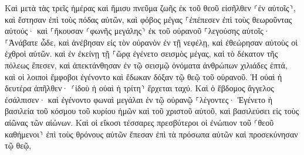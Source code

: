 \documentclass{openreader}
\begin{document}
Καὶ μετὰ τὰς τρεῖς ἡμέρας καὶ ἥμισυ πνεῦμα ζωῆς ἐκ τοῦ θεοῦ εἰσῆλθεν ⸂ἐν αὐτοῖς⸃, καὶ ἔστησαν ἐπὶ τοὺς πόδας αὐτῶν, καὶ φόβος μέγας ⸀ἐπέπεσεν ἐπὶ τοὺς θεωροῦντας αὐτούς· 
καὶ ⸀ἤκουσαν ⸂φωνῆς μεγάλης⸃ ἐκ τοῦ οὐρανοῦ ⸀λεγούσης αὐτοῖς· ⸀Ἀνάβατε ὧδε, καὶ ἀνέβησαν εἰς τὸν οὐρανὸν ἐν τῇ νεφέλῃ, καὶ ἐθεώρησαν αὐτοὺς οἱ ἐχθροὶ αὐτῶν. 
καὶ ἐν ἐκείνῃ τῇ ⸀ὥρᾳ ἐγένετο σεισμὸς μέγας, καὶ τὸ δέκατον τῆς πόλεως ἔπεσεν, καὶ ἀπεκτάνθησαν ἐν τῷ σεισμῷ ὀνόματα ἀνθρώπων χιλιάδες ἑπτά, καὶ οἱ λοιποὶ ἔμφοβοι ἐγένοντο καὶ ἔδωκαν δόξαν τῷ θεῷ τοῦ οὐρανοῦ. 
Ἡ οὐαὶ ἡ δευτέρα ἀπῆλθεν· ⸂ἰδοὺ ἡ οὐαὶ ἡ τρίτη⸃ ἔρχεται ταχύ. 
Καὶ ὁ ἕβδομος ἄγγελος ἐσάλπισεν· καὶ ἐγένοντο φωναὶ μεγάλαι ἐν τῷ οὐρανῷ ⸀λέγοντες· Ἐγένετο ἡ βασιλεία τοῦ κόσμου τοῦ κυρίου ἡμῶν καὶ τοῦ χριστοῦ αὐτοῦ, καὶ βασιλεύσει εἰς τοὺς αἰῶνας τῶν αἰώνων. 
Καὶ οἱ εἴκοσι τέσσαρες πρεσβύτεροι οἱ ἐνώπιον τοῦ ⸂θεοῦ καθήμενοι⸃ ἐπὶ τοὺς θρόνους αὐτῶν ἔπεσαν ἐπὶ τὰ πρόσωπα αὐτῶν καὶ προσεκύνησαν τῷ θεῷ, 
\end{document}
